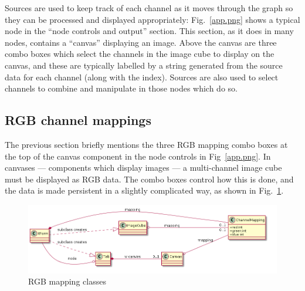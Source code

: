 Sources are used to keep track of each channel as it moves through the graph so they can be processed and displayed appropriately:
Fig.~\ref{app.png} shows a typical node in the ``node controls and output'' section. This section, as it does in many nodes,
contains a ``canvas'' displaying an image. Above the canvas are three combo boxes which select the channels in the image cube to display on the canvas,
and these are typically labelled by a string generated from the source data for each channel (along with the index). Sources are also used
to select channels to combine and manipulate in those nodes which do so.

\subsection{RGB channel mappings}
The previous section briefly mentions the three RGB mapping combo boxes at the
top of the canvas component in the node controls in Fig~\ref{app.png}. In
canvases --- components which display images --- a multi-channel image cube
must be displayed as RGB data. The combo boxes control how this is done, and
the data is made persistent in a slightly complicated way, as shown in Fig.~\ref{rgb.png}.

\begin{figure}[ht]
\center
\includegraphics[width=5in]{rgb.png}
\caption{RGB mapping classes}
\label{rgb.png}
\end{figure}

